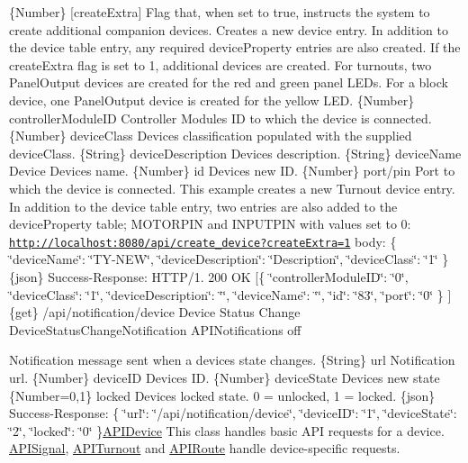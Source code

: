 \{Number\} \mbox{[}create\+Extra\mbox{]} Flag that, when set to true, instructs the system to create additional companion devices.  Creates a new device entry. In addition to the device table entry, any required device\+Property entries are also created. If the create\+Extra flag is set to 1, additional devices are created. For turnouts, two Panel\+Output devices are created for the red and green panel L\+E\+Ds. For a block device, one Panel\+Output device is created for the yellow L\+ED.  \{Number\} controller\+Module\+ID Controller Module\textquotesingle{}s ID to which the device is connected.  \{Number\} device\+Class Device\textquotesingle{}s classification populated with the supplied device\+Class.  \{String\} device\+Description Device\textquotesingle{}s description.  \{String\} device\+Name Device Device\textquotesingle{}s name.  \{Number\} id Device\textquotesingle{}s new ID.  \{Number\} port/pin Port to which the device is connected.  This example creates a new Turnout device entry. In addition to the device table entry, two entries are also added to the device\+Property table; M\+O\+T\+O\+R\+P\+IN and I\+N\+P\+U\+T\+P\+IN with values set to 0\+: \href{http://localhost:8080/api/create_device?createExtra=1}{\tt http\+://localhost\+:8080/api/create\+\_\+device?create\+Extra=1} body\+: \{ \char`\"{}device\+Name\char`\"{}\+: \char`\"{}\+T\+Y-\/\+N\+E\+W\char`\"{}, \char`\"{}device\+Description\char`\"{}\+: \char`\"{}\+Description\char`\"{}, \char`\"{}device\+Class\char`\"{}\+: \char`\"{}1\char`\"{} \}  \{json\} Success-\/\+Response\+: H\+T\+T\+P/1. 200 OK \mbox{[}\{ \char`\"{}controller\+Module\+I\+D\char`\"{}\+: \char`\"{}0\char`\"{}, \char`\"{}device\+Class\char`\"{}\+: \char`\"{}1\char`\"{}, \char`\"{}device\+Description\char`\"{}\+: \char`\"{}\char`\"{}, \char`\"{}device\+Name\char`\"{}\+: \char`\"{}\char`\"{}, \char`\"{}id\char`\"{}\+: \char`\"{}83\char`\"{}, \char`\"{}port\char`\"{}\+: \char`\"{}0\char`\"{} \} \mbox{]}  \{get\} /api/notification/device Device Status Change  Device\+Status\+Change\+Notification  A\+P\+I\+Notifications  off

Notification message sent when a device\textquotesingle{}s state changes.  \{String\} url Notification url.  \{Number\} device\+ID Device\textquotesingle{}s ID.  \{Number\} device\+State Device\textquotesingle{}s new state  \{Number=0,1\} locked Device\textquotesingle{}s locked state. 0 = unlocked, 1 = locked.  \{json\} Success-\/\+Response\+: \{ \char`\"{}url\char`\"{}\+: \char`\"{}/api/notification/device\char`\"{}, \char`\"{}device\+I\+D\char`\"{}\+: \char`\"{}1\char`\"{}, \char`\"{}device\+State\char`\"{}\+: \char`\"{}2\char`\"{}, \char`\"{}locked\char`\"{}\+: \char`\"{}0\char`\"{} \}\hyperlink{class_a_p_i_device}{A\+P\+I\+Device} This class handles basic A\+PI requests for a device. \hyperlink{class_a_p_i_signal}{A\+P\+I\+Signal}, \hyperlink{class_a_p_i_turnout}{A\+P\+I\+Turnout} and \hyperlink{class_a_p_i_route}{A\+P\+I\+Route} handle device-\/specific requests. 

